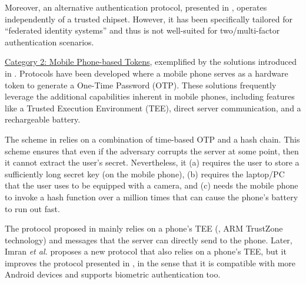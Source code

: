 Moreover, an alternative authentication protocol, presented in  \cite{zhang2020strong}, operates independently of a trusted chipset. However, it has been specifically tailored for ``federated identity systems'' and thus is not well-suited for two/multi-factor authentication scenarios.








%
\underline{Category 2: Mobile Phone-based Tokens}, exemplified by the solutions introduced in \cite{SARA22,KoganMB17,KonothFFARB20}. Protocols have been developed where a mobile phone serves as a hardware token to generate a One-Time Password (OTP). These solutions frequently leverage the additional capabilities inherent in mobile phones, including features like a Trusted Execution Environment (TEE), direct server communication, and a rechargeable battery.



The scheme in \cite{KoganMB17} relies on a combination of time-based OTP and a hash chain. This scheme ensures that even if the adversary corrupts the server at some point, then it cannot extract the user's secret. Nevertheless, it  (a) requires the user to store a sufficiently long secret key (on the mobile phone), (b) requires the laptop/PC that the user uses to be equipped with a camera, and (c) needs the mobile phone to invoke a hash function over a million times that can cause the phone's battery to run out fast. 

The protocol proposed in \cite{KonothFFARB20} mainly relies on a phone's TEE (\ie,  ARM TrustZone technology) and messages that the server can directly send to the phone. Later,  Imran \textit{et al.} \cite{SARA22} proposes a new protocol that also relies on a phone's TEE, but it improves the protocol presented in \cite{KonothFFARB20}, in the sense that it is compatible with more Android devices and supports biometric authentication too. 

